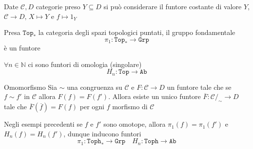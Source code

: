 \begin{example}
    Date \(\mathcal{C}, D\) categorie preso \(Y \subseteq D \) si può considerare il
    funtore costante di valore \(Y\), \(\mathcal{C} \to D\), \(X \mapsto Y\) e \(f \mapsto 1_Y\) 
\end{example}

\begin{example}{}
    Presa \(\mathtt{Top}_*\) la categoria degli spazi topologici puntati, il
    gruppo fondamentale 
    \[
        \pi_{1} : \mathtt{Top}_* \to \mathtt{Grp}
    \]
    è un funtore
\end{example}

\begin{example}{}
    \(\forall n \in \mathbb{N}\) ci sono funtori di omologia (singolare)
    \[
      H_{n} : \mathtt{Top} \to \mathtt{Ab}
    \]
\end{example}
\begin{theorem}{Omomorfismo}\label{thm:cat_hom}
    Sia \(\sim \) una congruenza su \(\mathcal{C}\) e \(F : \mathcal{C} \to D\) un funtore tale che
    se \(f \sim f'\) in \(\mathcal{C}\) allora \(F{(f)} = F{(f')}\).
    Allora esiste un unico funtore \(\overline{F} : \mathcal{C} /_\sim \to D\) tale
    che \(\overline{F}{(\overline{f})} = F{(f)}\) per ogni \(f\) morfismo di \(\mathcal{C}\) 
\end{theorem}
\begin{example}{}
    Negli esempi precedenti se \(f\) e \(f'\) sono omotope, allora \(\pi_{1}{(f)} = \pi_{1}{(f')}\) e \(H_{n}{(f)} = H_{n}{(f')}\), dunque inducono funtori
    \[
      \pi_{1} : \mathtt{Toph}_* \to \mathtt{Grp} \quad H_{n} : \mathtt{Toph} \to \mathtt{Ab}
    \]
\end{example}

